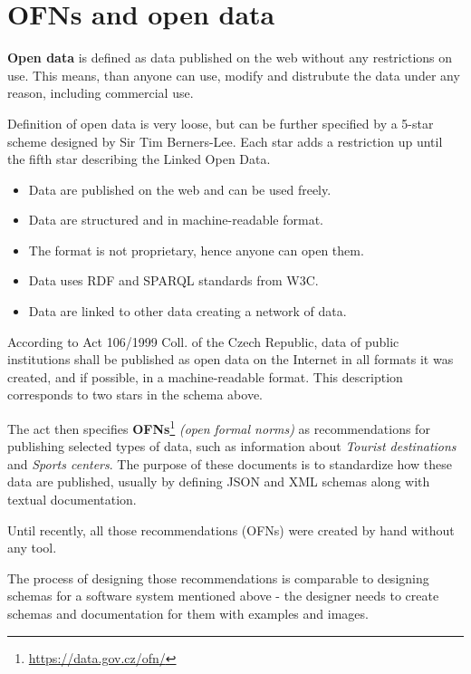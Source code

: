 \section*{OFNs and open data}

\textbf{Open data} is defined as data published on the web without any restrictions on use. This means, than anyone can use, modify and distrubute the data under any reason, including commercial use.

Definition of open data is very loose, but can be further specified by a 5-star scheme designed by Sir Tim Berners-Lee. Each star adds a restriction up until the fifth star describing the Linked Open Data.
\begin{itemize}[noitemsep,leftmargin=2cm]
    \item [1 $\bigstar$] Data are published on the web and can be used freely.
    \item [2 $\bigstar$] Data are structured and in machine-readable format.
    \item [3 $\bigstar$] The format is not proprietary, hence anyone can open them.
    \item [4 $\bigstar$] Data uses RDF and SPARQL standards from W3C.
    \item [5 $\bigstar$] Data are linked to other data creating a network of data.
\end{itemize}

\smallskip

According to Act 106/1999 Coll. of the Czech Republic, data of public institutions shall be published as open data on the Internet in all formats it was created, and if possible, in a machine-readable format. This description corresponds to two stars in the schema above.

The act then specifies \textbf{OFNs}\footnote{\url{https://data.gov.cz/ofn/}} \textit{(open formal norms)} as recommendations for publishing selected types of data, such as information about \textit{Tourist destinations} and \textit{Sports centers}. The purpose of these documents is to standardize how these data are published, usually by defining JSON and XML schemas along with textual documentation.

Until recently, all those recommendations (OFNs) were created by hand without any tool.

\smallskip

The process of designing those recommendations is comparable to designing schemas for a software system mentioned above - the designer needs to create schemas and documentation for them with examples and images.

